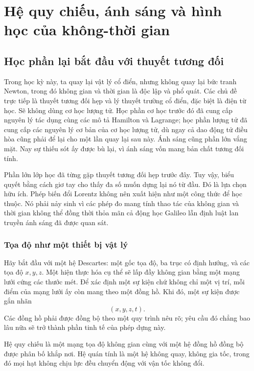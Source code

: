 \chapter{Hệ quy chiếu, ánh sáng và hình học của không-thời gian}

\section{Học phần lại bắt đầu với thuyết tương đối}

Trong học kỳ này, ta quay lại vật lý cổ điển, nhưng không quay lại bức tranh Newton, trong đó không gian và thời gian là độc lập và phổ quát. Các chủ đề trực tiếp là thuyết tương đối hẹp và lý thuyết trường cổ điển, đặc biệt là điện từ học. Sẽ không dùng cơ học lượng tử. Học phần cơ học trước đó đã cung cấp nguyên lý tác dụng cùng các mô tả Hamilton và Lagrange; học phần lượng tử đã cung cấp các nguyên lý cơ bản của cơ học lượng tử, dù ngay cả dao động tử điều hòa cũng phải để lại cho một lần quay lại sau này. Ánh sáng cũng phần lớn vắng mặt. Nay sự thiếu sót ấy được bù lại, vì ánh sáng vốn mang bản chất tương đối tính.

Phần lớn lớp học đã từng gặp thuyết tương đối hẹp trước đây. Tuy vậy, biểu quyết bằng cách giơ tay cho thấy đa số muốn dựng lại nó từ đầu. Đó là lựa chọn hữu ích. Phép biến đổi Lorentz không nên xuất hiện như một công thức để học thuộc. Nó phải nảy sinh vì các phép đo mang tính thao tác của không gian và thời gian không thể đồng thời thỏa mãn cả động học Galileo lẫn định luật lan truyền ánh sáng đã được quan sát.

\subsection{Tọa độ như một thiết bị vật lý}

Hãy bắt đầu với một hệ Descartes: một gốc tọa độ, ba trục có định hướng, và các tọa độ \(x,y,z\). Một hiện thực hóa cụ thể sẽ lấp đầy không gian bằng một mạng lưới cứng các thước mét. Để xác định một sự kiện chứ không chỉ một vị trí, mỗi điểm của mạng lưới ấy còn mang theo một đồng hồ. Khi đó, một sự kiện được gắn nhãn
\begin{equation}
(x,y,z,t).
\end{equation}
Các đồng hồ phải được đồng bộ theo một quy trình nêu rõ; yêu cầu đó chẳng bao lâu nữa sẽ trở thành phần tinh tế của phép dựng này.

\begin{definition}
Hệ quy chiếu là một mạng tọa độ không gian cùng với một hệ đồng hồ đồng bộ được phân bố khắp nơi. Hệ quán tính là một hệ không quay, không gia tốc, trong đó mọi hạt không chịu lực đều chuyển động với vận tốc không đổi.
\end{definition}

